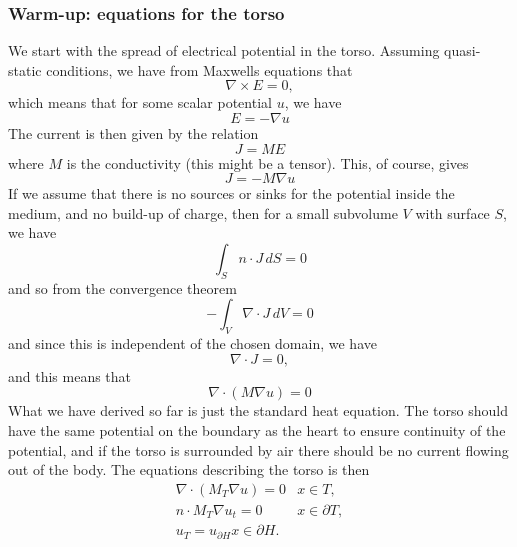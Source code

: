 \subsubsection{Warm-up: equations for the torso}
We start with the spread of electrical potential in the torso. Assuming quasi-static conditions, we have from Maxwells equations that 
\begin{equation}
 \nabla \times E = 0,
\end{equation}
which means that for some scalar potential $u$, we have 
\begin{equation}
 E = -\nabla u
\end{equation}
The current is then given by the relation 
\begin{equation}
 J = ME
\end{equation}
where $M$ is the conductivity (this might be a tensor). This, of course, gives 
\begin{equation}
 J = -M\nabla u
\end{equation}
If we assume that there is no sources or sinks for the potential inside the medium, and no build-up of charge, then for a small subvolume $V$ with surface $S$, we have 
\begin{equation}
 \int_S n\cdot J \, dS = 0
\end{equation}
and so from the convergence theorem 
\begin{equation}
 -\int_V \nabla \cdot J \, dV = 0
\end{equation}
and since this is independent of the chosen domain, we have 
\begin{equation}
 \nabla \cdot J = 0, 
\end{equation}
and this means that 
\begin{equation}
 \nabla \cdot (M \nabla u) = 0
\end{equation}
What we have derived so far is just the standard heat equation. The torso should have the same potential on the boundary as the heart to ensure continuity of the potential, and if the torso is surrounded by air there should be no current flowing out of the body. The equations describing the torso is then
\begin{align}
 \nabla \cdot (M_T \nabla u) = 0 & x \in T, \\
 n \cdot M_T \nabla u_t = 0 & x \in \partial T, \\
 u_T = u_{\partial H} x \in \partial H. 
\end{align}

